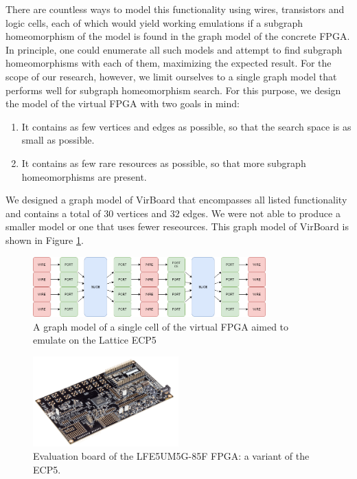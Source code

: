 There are countless ways to model this functionality using wires, transistors and logic cells, each of which would yield working emulations if a subgraph homeomorphism of the model is found in the graph model of the concrete FPGA. In principle, one could enumerate all such models and attempt to find subgraph homeomorphisms with each of them, maximizing the expected result. For the scope of our research, however, we limit ourselves to a single graph model that performs well for subgraph homeomorphism search. For this purpose, we design the model of the virtual FPGA with two goals in mind:

\begin{enumerate}
\item It contains as few vertices and edges as possible, so that the search space is as small as possible.
\item It contains as few rare resources as possible, so that more subgraph homeomorphisms are present.
\end{enumerate}

We designed a graph model of VirBoard that encompasses all listed functionality and contains a total of 30 vertices and 32 edges. We were not able to produce a smaller model or one that uses fewer reseources. This graph model of VirBoard is shown in Figure \ref{fig:virboard}.

\begin{figure}
\centering
\includegraphics[width=0.8\textwidth]{images/virtualFPGA2.png}
\caption{A graph model of a single cell of the virtual FPGA aimed to emulate on the Lattice ECP5}
\label{fig:virboard}
\end{figure}	


\begin{figure}
\centering
\includegraphics[width=0.5\textwidth]{images/ECP5.png}
\caption[Evaluation board of the LFE5UM5G-85F FPGA: a variant of the ECP5.]{Evaluation board of the LFE5UM5G-85F FPGA: a variant of the ECP5.\footnotemark}
\label{fig:evaluationboard}
\end{figure}





